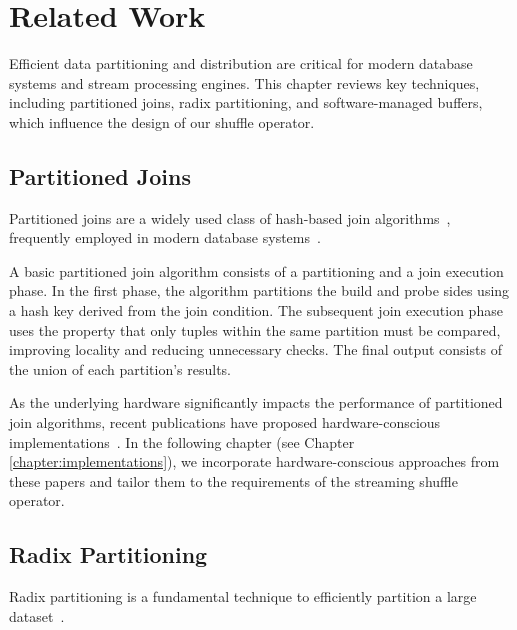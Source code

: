 
\chapter{Related Work}\label{chapter:related_work}\acresetall
Efficient data partitioning and distribution are critical for modern database systems and stream processing engines.
This chapter reviews key techniques, including partitioned joins, radix partitioning, and software-managed buffers, which influence the design of our shuffle operator.

\section{Partitioned Joins}\label{sec-rw-partitioning-joins}
Partitioned joins are a widely used class of hash-based join algorithms~\parencite{joins-real-system, hash-joins-hardware-tuning, equi-join-comparison}, frequently employed in modern database systems~\parencite{umbra, hyper, hyper-compilation}.

A basic partitioned join algorithm consists of a partitioning and a join execution phase.
In the first phase, the algorithm partitions the build and probe sides using a hash key derived from the join condition.
The subsequent join execution phase uses the property that only tuples within the same partition must be compared, improving locality and reducing unnecessary checks.
The final output consists of the union of each partition’s results.

As the underlying hardware significantly impacts the performance of partitioned join algorithms, recent publications have proposed hardware-conscious implementations~\parencite{hash-joins-hardware-tuning, radix-partitioning-case, main-memory-partitioning, data-partitioning-in-memory-systems}.
In the following chapter (see Chapter \ref{chapter:implementations}), we incorporate hardware-conscious approaches from these papers and tailor them to the requirements of the streaming shuffle operator.

\section{Radix Partitioning}\label{sec-rw-radix-partitioning}
Radix partitioning is a fundamental technique to efficiently partition a large dataset~\parencite{radix-partitioning, radix-partitioning-case, data-partitioning-in-memory-systems, partitioned-parallel-radix-sort}.

